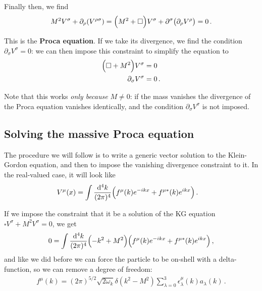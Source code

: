 \documentclass[main.tex]{subfiles}
\begin{document}
Finally then, we find 
%
\begin{align}
M^2 V^{\sigma } + \partial_{\rho } \qty(V^{\rho \sigma }) = \qty(M^2 + \square )V^{\sigma } + \partial^{\sigma }\qty(\partial_{\rho }V^{\rho }) = 0
\,.
\end{align}

This is the \textbf{Proca equation}. If we take its divergence, we find the condition \( \partial_{\sigma } V^{\sigma } = 0\): we can then impose this constraint to simplify the equation to 
%
\begin{subequations}
\begin{align}
\qty(\square + M^2 ) V^{\sigma } &= 0   \\
\partial_{\sigma } V^{\sigma } &= 0
\,.
\end{align}
\end{subequations}

Note that this works \emph{only because} \(M \neq 0\): if the mass vanishes the divergence of the Proca equation vanishes identically, and the condition \(\partial_{\sigma } V^{\sigma }\) is not imposed. 

\subsection{Solving the massive Proca equation}

The procedure we will follow is to write a generic vector solution to the Klein-Gordon equation, and then to impose the vanishing divergence constraint to it. 
In the real-valued case, it will look like 
%
\begin{align}
V^{\mu } (x) &= \int \frac{ \dd[4]{k}}{(2 \pi )^{4}} \qty(f^{\mu }(k) e^{-ikx} + f^{\mu *} (k) e^{ikx}) 
\,.
\end{align}

If we impose the constraint that it be a solution of the KG equation \(\square V^{\sigma } + M^2 V^{\sigma } = 0\), we get 
%
\begin{align}
0= \int \frac{ \dd[4]{k}}{(2 \pi )^{4}} \qty(- k^2 + M^2) \qty(f^{\mu }(k) e^{-ikx} + f^{\mu *} (k) e^{ikx}) 
\,,
\end{align}
%
and like we did before we can force the particle to be on-shell with a delta-function, so we can remove a degree of freedom:
%
\begin{align}
f^{\mu }(k) = (2 \pi )^{5/2} \sqrt{2 \omega_{k}} \delta (k^2 - M^2)
\sum _{\lambda=0}^{3}
\epsilon^{\mu }_{\lambda }(k) a_\lambda (k)
\,.
\end{align}
\end{document}
